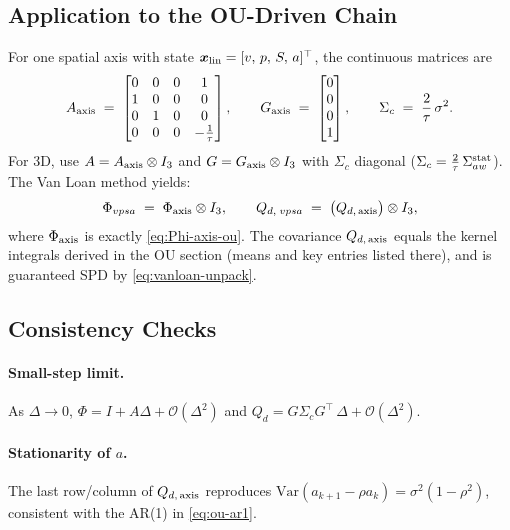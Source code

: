 \documentclass[11pt]{article}
\begin{document}
\subsection{Application to the OU-Driven Chain}
For one spatial axis with state $\bm x_{\rm lin}=[v,\,p,\,S,\,a]^\top$, the continuous matrices are
\begin{equation}
A_{\rm axis} \;=\;
\begin{bmatrix}
0 & 0 & 0 & 1\\
1 & 0 & 0 & 0\\
0 & 1 & 0 & 0\\
0 & 0 & 0 & -\tfrac{1}{\tau}
\end{bmatrix},
\qquad
G_{\rm axis} \;=\;
\begin{bmatrix}0\\0\\0\\1\end{bmatrix},
\qquad
\Sigma_c \;=\; \frac{2}{\tau}\,\sigma^2.
\label{eq:Aaxis-Gaxis}
\end{equation}
For 3D, use $A = A_{\rm axis}\otimes I_3$ and $G=G_{\rm axis}\otimes I_3$ with $\Sigma_c$ diagonal
($\Sigma_c = \tfrac{2}{\tau}\,\Sigma_{aw}^{\rm stat}$). The Van Loan method yields:
\begin{equation}
\Phi_{vpsa} \;=\; \Phi_{\rm axis}\otimes I_3,
\qquad
Q_{d,\;vpsa} \;=\; \big(Q_{d,\,\rm axis}\big)\otimes I_3,
\label{eq:axis-3d}
\end{equation}
where $\Phi_{\rm axis}$ is exactly \eqref{eq:Phi-axis-ou}. The covariance $Q_{d,\,\rm axis}$ equals the kernel integrals
derived in the OU section (means and key entries listed there), and is guaranteed SPD by \eqref{eq:vanloan-unpack}.

\subsection{Consistency Checks}
\paragraph{Small-step limit.} As $\Delta\to 0$, $\Phi=I+A\Delta+\mathcal{O}(\Delta^2)$ and $Q_d=G\Sigma_c G^\top\,\Delta+\mathcal{O}(\Delta^2)$.
\paragraph{Stationarity of $a$.} The last row/column of $Q_{d,\,\rm axis}$ reproduces $\mathrm{Var}(a_{k+1}-\rho a_k)=\sigma^2(1-\rho^2)$,
consistent with the AR(1) in \eqref{eq:ou-ar1}.
\end{document}
